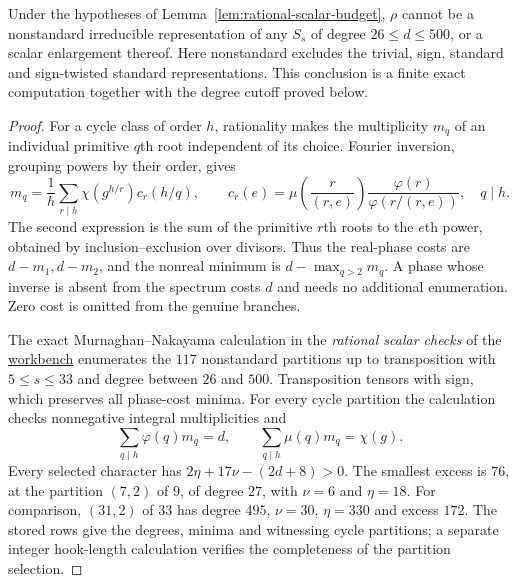 \begin{proposition}
\label{prop:symmetric-scalar-exclusion}
Under the hypotheses of Lemma~\ref{lem:rational-scalar-budget},
$\rho$ cannot be a nonstandard irreducible representation of any
$S_s$ of degree $26\le d\le500$, or a scalar enlargement thereof.
Here nonstandard excludes the trivial, sign, standard and
sign-twisted standard representations.  This conclusion is a finite
exact computation together with the degree cutoff proved below.
\end{proposition}
\begin{proof}
For a cycle class of order $h$, rationality makes the multiplicity
$m_q$ of an individual primitive $q$th root independent of its choice.
Fourier inversion, grouping powers by their order, gives
\[
 m_q=\frac1h\sum_{r\mid h}\chi(g^{h/r})c_r(h/q),\qquad
 c_r(e)=\mu\left(\frac r{(r,e)}\right)
       \frac{\varphi(r)}{\varphi(r/(r,e))},\quad q\mid h.
\]
The second expression is the sum of the primitive $r$th roots to
the $e$th power, obtained by inclusion--exclusion over divisors.
Thus the real-phase costs are $d-m_1,d-m_2$, and the nonreal
minimum is $d-\max_{q>2}m_q$.  A phase whose inverse is absent
from the spectrum costs $d$ and needs no additional enumeration.
Zero cost is omitted from the genuine branches.

The exact Murnaghan--Nakayama calculation in the
\emph{rational scalar checks} of the
\href{\workbenchurl}{workbench} enumerates the $117$ nonstandard
partitions up to transposition with $5\le s\le33$ and degree
between $26$ and $500$.  Transposition tensors with sign, which
preserves all phase-cost minima.  For every cycle partition the
calculation checks nonnegative integral multiplicities and
\[
 \sum_{q\mid h}\varphi(q)m_q=d,\qquad
 \sum_{q\mid h}\mu(q)m_q=\chi(g).
\]
Every selected character has
$2\eta+17\nu-(2d+8)>0$.  The smallest excess is $76$,
at the partition $(7,2)$ of $9$, of degree $27$, with
$\nu=6$ and $\eta=18$.  For comparison, $(31,2)$ of $33$
has degree $495$, $\nu=30$, $\eta=330$ and excess $172$.
The stored rows give the degrees, minima and witnessing cycle
partitions; a separate integer hook-length calculation verifies
the completeness of the partition selection.


\end{proof}
